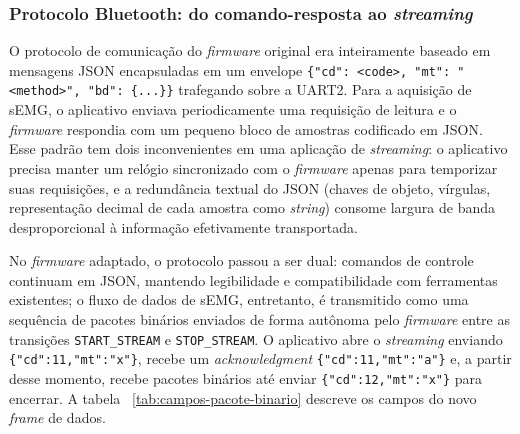 \subsubsection{Protocolo Bluetooth: do comando-resposta ao \textit{streaming}}\label{subsubsec:NEProtocolo}

O protocolo de comunicação do \textit{firmware} original era inteiramente baseado em mensagens JSON encapsuladas em um envelope \verb|{"cd": <code>, "mt": "<method>", "bd": {...}}| trafegando sobre a UART2. Para a aquisição de sEMG, o aplicativo enviava periodicamente uma requisição de leitura e o \textit{firmware} respondia com um pequeno bloco de amostras codificado em JSON. Esse padrão tem dois inconvenientes em uma aplicação de \textit{streaming}: o aplicativo precisa manter um relógio sincronizado com o \textit{firmware} apenas para temporizar suas requisições, e a redundância textual do JSON (chaves de objeto, vírgulas, representação decimal de cada amostra como \textit{string}) consome largura de banda desproporcional à informação efetivamente transportada.

No \textit{firmware} adaptado, o protocolo passou a ser dual: comandos de controle continuam em JSON, mantendo legibilidade e compatibilidade com ferramentas existentes; o fluxo de dados de sEMG, entretanto, é transmitido como uma sequência de pacotes binários enviados de forma autônoma pelo \textit{firmware} entre as transições \texttt{START\_STREAM} e \texttt{STOP\_STREAM}. O aplicativo abre o \textit{streaming} enviando \verb|{"cd":11,"mt":"x"}|, recebe um \textit{acknowledgment} \verb|{"cd":11,"mt":"a"}| e, a partir desse momento, recebe pacotes binários até enviar \verb|{"cd":12,"mt":"x"}| para encerrar. A tabela ~\ref{tab:campos-pacote-binario} descreve os campos do novo \textit{frame} de dados.



